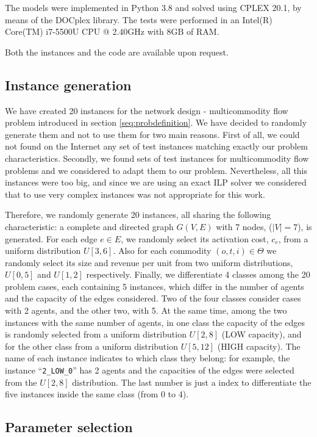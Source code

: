 \documentclass[review]{elsarticle}
\begin{document}
The models were implemented in Python 3.8 and solved using CPLEX 20.1, by means of the DOCplex library. The tests were performed in an  Intel(R) Core(TM) i7-5500U CPU @ 2.40GHz with 8GB of RAM.

Both the instances and the code are available upon request.


\subsection{Instance generation}

We have created 20 instances for the network design - multicommodity flow problem introduced in section \ref{seq:probdefinition}. We have decided to randomly generate them and not to use them for two main reasons. First of all, we could not found on the Internet any set of test instances matching exactly our problem characteristics. Secondly, we found sets of test instances for multicommodity flow problems \cite{MCFPWEB} and we considered to adapt them to our problem. Nevertheless, all this instances were too big, and since we are using an exact ILP solver we considered that to use very complex instances was not appropriate for this work.

Therefore, we randomly generate 20 instances, all sharing the following characteristic: a complete and directed graph $G(V,E)$ with 7 nodes, ($|V|=7$), is generated. For each edge $e\in E$, we randomly select its activation cost, $c_e$, from a uniform distribution $U[3,6]$. Also for each commodity $(o,t,i)\in \Theta$ we randomly select its size and revenue per unit from two uniform distributions, $U[0,5]$ and $U[1,2]$ respectively. Finally, we differentiate 4 classes among the 20 problem cases, each containing 5 instances, which differ in the number of agents and the capacity of the edges considered. Two of the four classes consider cases with 2 agents, and the other two, with 5. At the same time, among the two instances with the same number of agents,  in one class the capacity of the edges is randomly selected from a uniform distribution $U[2,8]$ (LOW capacity), and for the other class from a uniform distribution $U[5,12]$ (HIGH capacity).
The name of each instance indicates to which class they belong: for example, the instance ``\texttt{2\_LOW\_0}'' has 2 agents and the capacities of the edges were selected from the $U[2,8]$ distribution. The last number is just a index to differentiate the five instances inside the same class (from 0 to 4).

\subsection{Parameter selection}
\end{document}
